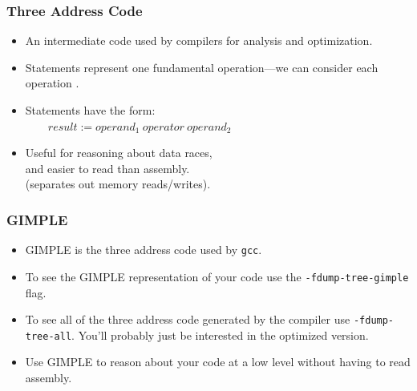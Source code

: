 \documentclass[aspectratio=43]{beamer}
\newenvironment{changemargin}[1]{%
  \begin{list}{}{%
    \setlength{\topsep}{0pt}%
    \setlength{\leftmargin}{#1}%
    \setlength{\rightmargin}{1em}
    \setlength{\listparindent}{\parindent}%
    \setlength{\itemindent}{\parindent}%
    \setlength{\parsep}{\parskip}%
  }%
  \item[]}{\end{list}}
\begin{document}
\begin{frame}
  \frametitle{Three Address Code}

  \begin{changemargin}{2.5cm}
  \begin{itemize}
    \item An intermediate code used by compilers
      for analysis and optimization.
    \vfill
    \item Statements represent one fundamental operation---we
      can consider each operation .
    \vfill
    \item Statements have the form:\\
      $\qquad result := operand_1\:operator\:operand_2$
    \vfill
    \item Useful for reasoning about data races,\\ and easier to read than assembly. \\
            \hspace*{1cm} (separates out memory reads/writes).
  \end{itemize}
  \end{changemargin}
\end{frame}

\begin{frame}
  \frametitle{GIMPLE}

  \begin{changemargin}{2.5cm}
  \begin{itemize}
    \item GIMPLE is the three address code used by {\tt gcc}.
    \vfill
    \item To see the GIMPLE representation of your code use the
      {\tt -fdump-tree-gimple} flag.
    \vfill
    \item To see all of the three address code generated by the compiler use
      {\tt -fdump-tree-all}. You'll probably just be interested in the
      optimized version.
    \vfill
    \item Use GIMPLE to reason about your code at a low level without
      having to read assembly.
  \end{itemize}
  \end{changemargin}
\end{frame}
\end{document}
